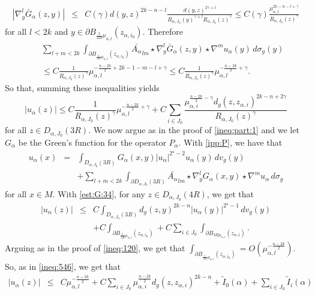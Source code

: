 \documentclass[reqno]{amsart}
\def \crit {2^\star}
\def \ua {u_\alpha}
\def \mai {\mu_{\alpha,i}}
\def \zai {z_{\alpha,i}}
\def \mal {\mu_{\alpha,l}}
\begin{document}
\begin{eqnarray*}
|\nabla^l_y\bar{G}_\alpha(z,y)|&\leq& C(\gamma) d(y,z)^{2k-n-l}\frac{d(y,z)^{2\gamma+l}}{R_{\alpha, J_0}(y)^{\gamma+l}R_{\alpha, J_0}(z)^\gamma}\leq  C(\gamma) \frac{\mal^{2k-n-l+\gamma}}{ R_{\alpha, J_0}(z)^\gamma}
\end{eqnarray*}
for all $l<2k$ and $y\in  \partial   B_{\frac{1}{2R}\mal}(z_{\alpha, i_0})$. Therefore
\begin{eqnarray}
&& \sum_{l+m<2k}\int_{\partial B_{\frac{1}{2R}\mal}(z_{\alpha, i_0}) }\bar{A_\alpha}_{lm}\star\nabla^l_y\bar{G}_\alpha(z,y)\star \nabla^m \ua(y)\, d\sigma_g(y)\nonumber\\
&&\leq C  \frac{1}{ R_{\alpha, J_0}(z)^\gamma} \mal^{ -\frac{n-2k}{2}+ 2k-1-m-l+\gamma}\leq C   \frac{1}{ R_{\alpha, J_0}(z)^\gamma} \mal^{ -\frac{n-2k}{2} +\gamma}.\label{ineq:120}
\end{eqnarray}
So that, summing these inequalities yields
\begin{equation*}
|\ua(z)|\leq  C\frac{1}{ R_{\alpha, J_0}(z)^\gamma} \mal^{ -\frac{n-2k}{2} +\gamma}+ C\sum_{i\in J_0}\frac{\mai^{\frac{n-2k}{2}-\gamma }d_g(z,\zai)^{2k-n+2\gamma}}{R_{\alpha, J_0}(z)^{\gamma}}
\end{equation*}
for all $z\in D_{\alpha, J_0}(3R)$. We now argue as in the proof of \eqref{ineq:part:1} and we let $G_\alpha$ be the Green's function for the operator $P_\alpha$. With \eqref{ipp:P}, we have that
\begin{eqnarray*}
\ua(x)&=&\int_{D_{\alpha, J_0}(3R)} G_\alpha(x,y)|\ua|^{\crit-2}\ua(y)\, dv_g(y)\\
&&+ \sum_{l+m<2k}\int_{\partial D_{\alpha, J_0}(3R)}\bar{A_\alpha}_{lm}\star\nabla^l_yG_\alpha(x,y)\star \nabla^m u_\alpha\, d\sigma_g
\end{eqnarray*}
for all $x\in M$. With \eqref{est:G:34}, for any $z\in D_{\alpha, J_0}(4R)$, we get that
\begin{eqnarray*}
|\ua(z)|&\leq& C\int_{D_{\alpha, J_0}(3R)}d_g(z,y)^{2k-n}|\ua(y)|^{\crit-1}\, dv_g(y)\\
& &+C\int_{\partial B_{\frac{1}{3R}\mal}(z_{\alpha, i_0})}+C\sum_{i\in J_0}\int_{\partial B_{3R\mai}(\zai)}.
\end{eqnarray*}
Arguing as in the proof of \eqref{ineq:120}, we get that $\int_{\partial B_{\frac{1}{3R}\mal}(z_{\alpha, i_0})}=O(\mal^{ -\frac{n-2k}{2}  })$. So, as in \eqref{ineq:546}, we get that
\begin{eqnarray}
|\ua(z)|&\leq& C\mal^{ -\frac{n-2k}{2}  }+C\sum_{i\in J_0} \mai^{\frac{n-2k}{2}}d_g(z,\zai)^{2k-n} + \tilde{I}_0(\alpha) +\sum_{i\in J_0}\tilde{I}_i(\alpha)\label{final:1}
\end{eqnarray}
\end{document}
